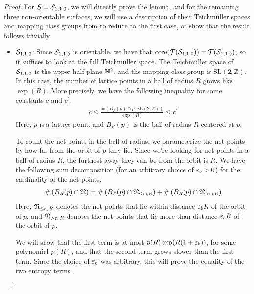 \documentclass[12pt, reqno]{amsart}
\begin{document}
\begin{proof}
  For $S = \mathcal{S}_{1,1,0}$, we will directly prove the lemma, and for the remaining three non-orientable surfaces, we will use a description of their Teichmüller spaces and mapping class groups from \textcite{gendulphe2017whats} to reduce to the first case, or show that the result follows trivially.
  \begin{itemize}
  \item $\mathcal{S}_{1,1,0}$: Since $\mathcal{S}_{1,1,0}$ is orientable, we have that $\mathrm{core(\mathcal{T}(\mathcal{S}_{1,1,0}))} = \mathcal{T}(\mathcal{S}_{1,1,0})$, so it suffices to look at the full Teichmüller space.
    The Teichmüller space of $\mathcal{S}_{1,1,0}$ is the upper half plane $\mathbb{H}^2$, and the mapping class group is $\mathrm{SL}(2, \mathbb{Z})$.
    In this case, the number of lattice points in a ball of radius $R$ grows like $\exp(R)$.
    More precisely, we have the following inequality for some constants $c$ and $c^\prime$.
    \begin{align}
      c \leq \frac{\#\left( B_R(p) \cap p \cdot \mathrm{SL}(2, \mathbb{Z}) \right)}{\exp(R)} \leq c^{\prime} \label{eq:lattice-point-count}
    \end{align}
    Here, $p$ is a lattice point, and $B_R(p)$ is the ball of radius $R$ centered at $p$.

    To count the net points in the ball of radius, we parameterize the net points by how far from the orbit of $p$ they lie. Since we're looking for net points in a ball of radius $R$, the furthest away they can be from the orbit is $R$.
    We have the following sum decomposition (for an arbitrary choice of $\varepsilon_b > 0$) for the cardinality of the net points.
    \begin{align}
      \label{eq:net-point-decomposition-base-case}
      \#\left( B_R(p) \cap \mathfrak{N} \right) = \#\left( B_R(p) \cap \mathfrak{N}_{\leq \varepsilon_b R} \right) + \#\left( B_R(p) \cap \mathfrak{N}_{> \varepsilon_b R} \right)
    \end{align}
    Here, $\mathfrak{N}_{\leq \varepsilon_b R}$ denotes the net points that lie within distance $\varepsilon_b R$ of the orbit of $p$, and $\mathfrak{N}_{> \varepsilon_b R}$ denotes the net points that lie more than distance $\varepsilon_b R$ of the orbit of $p$.

    We will show that the first term is at most $p(R) \exp(R(1 + \varepsilon_b))$, for some polynomial $p(R)$, and that the second term grows slower than the first term.
    Since the choice of $\varepsilon_b$ was arbitrary, this will prove the equality of the two entropy terms.


\end{itemize}
\end{proof}
\end{document}
